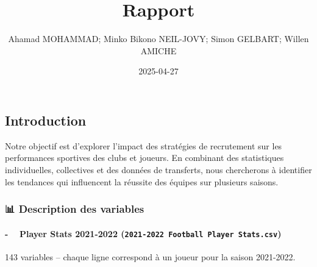 \documentclass[
]{article}
\title{Rapport}
\author{Ahamad MOHAMMAD; Minko Bikono NEIL-JOVY; Simon GELBART; Willen
AMICHE}
\date{2025-04-27}
\begin{document}
\maketitle

\subsection{\texorpdfstring{\textbf{Introduction}}{Introduction}}\label{introduction}

Notre objectif est d'explorer l'impact des stratégies de recrutement sur
les performances sportives des clubs et joueurs. En combinant des
statistiques individuelles, collectives et des données de transferts,
nous chercherons à identifier les tendances qui influencent la réussite
des équipes sur plusieurs saisons.

\subsubsection{\texorpdfstring{\textbf{📊 Description des
variables}}{📊 Description des variables}}\label{description-des-variables}

\paragraph{\texorpdfstring{- 🧍‍♂️ Player Stats 2021-2022
(\texttt{2021-2022\ Football\ Player\ Stats.csv})}{- 🧍‍♂️ Player Stats 2021-2022 (2021-2022 Football Player Stats.csv)}}\label{player-stats-2021-2022-2021-2022-football-player-stats.csv}

143 variables -- chaque ligne correspond à un joueur pour la saison
2021-2022.
\end{document}
